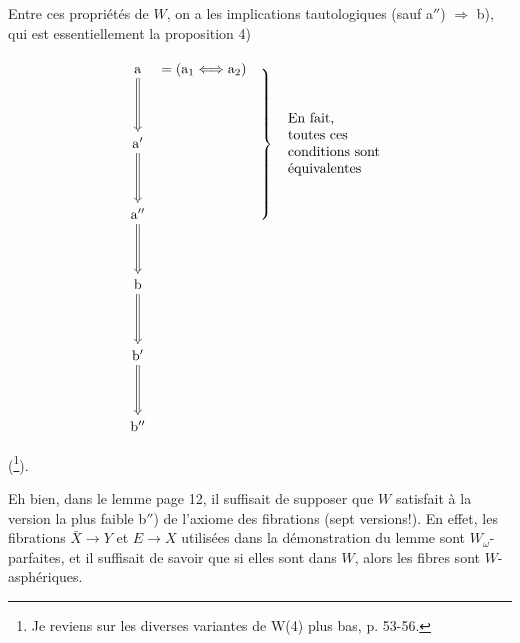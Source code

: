 Entre ces propriétés de $W$, on a les implications tautologiques (sauf a$''$) $\Longrightarrow$ b), qui est essentiellement la proposition 4)


\[
\begin{tikzcd}[row sep=huge, column sep=0pt]
\mathrm{a} \arrow[d, Rightarrow] & {}= (\mathrm{a}_1 \Longleftrightarrow \mathrm{a}_2) & \hspace{2.5cm} \\
\mathrm{a}' \arrow[d, Rightarrow] & & \smash{\left.\rule[-1.8cm]{0pt}{3.6cm}\right\}\ \text{\begin{tabular}{l}En fait,\\ toutes ces\\ conditions sont\\ équivalentes\end{tabular}}} \\
\mathrm{a}'' \arrow[d, Rightarrow] & & \\
\mathrm{b} \arrow[d, Rightarrow] & & \\
\mathrm{b}' \arrow[d, Rightarrow] & & \\
\mathrm{b}'' & &
\end{tikzcd}
\]

(\footnote[33]{Je reviens sur les diverses variantes de W(4) plus bas, p. 53-56.}).

Eh bien, dans le lemme page 12, il suffisait de supposer que $W$ satisfait à la version la plus faible b$''$) de l'axiome des fibrations (sept versions!). En effet, les fibrations $\bar{X} \longrightarrow Y$ et $E \longrightarrow X$ utilisées dans la démonstration du lemme sont $W_\omega$-parfaites, et il suffisait de savoir que si elles sont dans $W$, alors les fibres sont $W$-asphériques.

